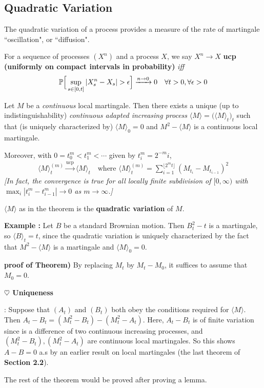 \documentclass[12pt,a4paper]{article}
\newenvironment{proof}
{\begin{changemargin}{0.5cm}{0.5cm} 
	}%
	{\end{changemargin}
}
\newenvironment{subproof}
{\begin{changemargin}{0.5cm}{0.5cm} 
	}%
	{\end{changemargin}
}
\newenvironment{p}
{\begin{proof} 
	}%
	{\end{proof}
}
\begin{document}
\subsection{Quadratic Variation}

The quadratic variation of a process provides a measure of the rate of martingale ``oscillation", or ``diffusion". 
\s

 For a sequence of processes $(X^n)$ and a process $X$, we say $X^n \rightarrow X$ \textbf{ucp (uniformly on compact intervals in probability)} \emph{iff}
\begin{align*}
\mathbb{P} \Big[ \sup_{s\in [0,t]} |X_s^n -X_s | > \epsilon \Big] \xrightarrow{n\rightarrow 0} 0 \quad \forall t >0, \forall \epsilon >0
\end{align*}
\s

\thm Let $M$ be a \emph{continuous} local martingale. Then there exists a unique (up to indistinguishability) \emph{continuous adapted increasing process} $\langle M \rangle = \big( \langle M \rangle_t \big)_t$ such that (is uniquely characterized by) $\langle M \rangle_0 =0$ and $M^2 -\langle M \rangle$ is a continuous local martingale.

\quad Moreover, with $0=t_0^m < t_1^m < \cdots$ given by $t_i^m = 2^{-m}i$,
\begin{align*}
\langle M \rangle_t^{(m)} \xrightarrow{\text{ucp}} \langle M \rangle_t \quad \text{where } \langle M \rangle_t^{(m)} = \sum_{i=1}^{\lfloor 2^m t \rfloor} (M_{t_i} - M_{t_{i-1}})^2
\end{align*}
\emph{[In fact, the convergence is true for all locally finite subdivision of $[0, \infty)$ with $\max_i |t_i^m - t_{i-1}^m| \rightarrow 0$ as $m\rightarrow \infty$.]}
\s

 $\langle M \rangle$ as in the theorem is the \textbf{quadratic variation} of $M$.
\s

\textbf{Example :} Let $B$ be a standard Brownian motion. Then $B_t^2 -t$ is a martingale, so $\langle B \rangle_t =t$, since the quadratic variation is uniquely characterized by the fact that $M^2 -\langle M \rangle$ is a martingale and $\langle M \rangle_0=0$.
\s

\begin{p}
\textbf{proof of Theorem)} By replacing $M_t$ by $M_t - M_0$, it suffices to assume that $M_0=0$.
\s

\textbf{$\heartsuit$ Uniqueness}
\begin{subproof}
: Suppose that $(A_t)$ and $(B_t)$ both obey the conditions required for $\langle M \rangle$. Then $A_t -B_t = (M_t^2 - B_t) - (M_t^2 - A_t)$. Here, $A_t - B_t$ is of finite variation since is a difference of two continuous increasing processes, and $(M_t^2 -B_t), (M_t^2 -A_t)$ are continuous local martingales. So this shows $A-B=0$ a.s by an earlier result on local martingales (the last theorem of \textbf{Section 2.2}).
\end{subproof}

The rest of the theorem would be proved after proving a lemma.
\end{p}
\s
\end{document}
